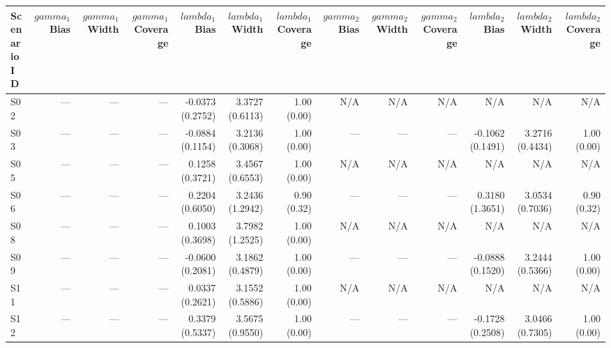 \begin{tabular}{lrrrrrrrrrrrr}
\toprule
Scenario ID & $gamma_{1}$ Bias & $gamma_{1}$ Width & $gamma_{1}$ Coverage & $lambda_{1}$ Bias & $lambda_{1}$ Width & $lambda_{1}$ Coverage & $gamma_{2}$ Bias & $gamma_{2}$ Width & $gamma_{2}$ Coverage & $lambda_{2}$ Bias & $lambda_{2}$ Width & $lambda_{2}$ Coverage \\
\midrule
S02 & --- & --- & --- & -0.0373 (0.2752) & 3.3727 (0.6113) & 1.00 (0.00) & N/A & N/A & N/A & N/A & N/A & N/A \\
S03 & --- & --- & --- & -0.0884 (0.1154) & 3.2136 (0.3068) & 1.00 (0.00) & --- & --- & --- & -0.1062 (0.1491) & 3.2716 (0.4434) & 1.00 (0.00) \\
S05 & --- & --- & --- & 0.1258 (0.3721) & 3.4567 (0.6553) & 1.00 (0.00) & N/A & N/A & N/A & N/A & N/A & N/A \\
S06 & --- & --- & --- & 0.2204 (0.6050) & 3.2436 (1.2942) & 0.90 (0.32) & --- & --- & --- & 0.3180 (1.3651) & 3.0534 (0.7036) & 0.90 (0.32) \\
S08 & --- & --- & --- & 0.1003 (0.3698) & 3.7982 (1.2525) & 1.00 (0.00) & N/A & N/A & N/A & N/A & N/A & N/A \\
S09 & --- & --- & --- & -0.0600 (0.2081) & 3.1862 (0.4879) & 1.00 (0.00) & --- & --- & --- & -0.0888 (0.1520) & 3.2444 (0.5366) & 1.00 (0.00) \\
S11 & --- & --- & --- & 0.0337 (0.2621) & 3.1552 (0.5886) & 1.00 (0.00) & N/A & N/A & N/A & N/A & N/A & N/A \\
S12 & --- & --- & --- & 0.3379 (0.5337) & 3.5675 (0.9550) & 1.00 (0.00) & --- & --- & --- & -0.1728 (0.2508) & 3.0466 (0.7305) & 1.00 (0.00) \\
\bottomrule
\end{tabular}
